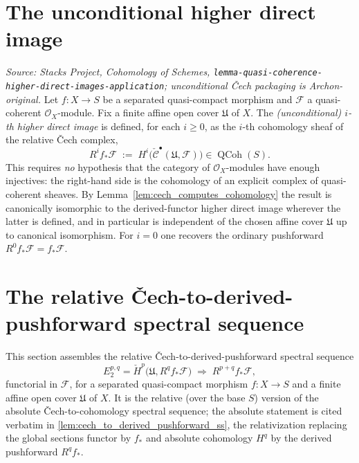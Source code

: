 \section{The unconditional higher direct image}

\begin{definition}\leanok
  \label{def:cech_higher_direct_image}
  \textit{Source: Stacks Project, Cohomology of Schemes,
  \texttt{lemma-quasi-coherence-higher-direct-images-application}; unconditional
  {\v C}ech packaging is Archon-original.}
  Let \(f : X \to S\) be a separated quasi-compact morphism and \(\mathcal{F}\) a
  quasi-coherent \(\mathcal{O}_X\)-module. Fix a finite affine open cover
  \(\mathfrak{U}\) of \(X\). The \emph{(unconditional) \(i\)-th higher direct
  image} is defined, for each \(i \geq 0\), as the \(i\)-th cohomology sheaf of the
  relative {\v C}ech complex,
  \[
    R^i f_*\mathcal{F} \;:=\;
      H^i\bigl(\check{\mathcal{C}}^\bullet(\mathfrak{U}, \mathcal{F})\bigr)
      \in \operatorname{QCoh}(S).
  \]
  This requires \emph{no} hypothesis that the category of \(\mathcal{O}_X\)-modules
  have enough injectives: the right-hand side is the cohomology of an explicit
  complex of quasi-coherent sheaves. By
  Lemma~\ref{lem:cech_computes_cohomology} the result is canonically isomorphic to
  the derived-functor higher direct image wherever the latter is defined, and in
  particular is independent of the chosen affine cover \(\mathfrak{U}\) up to
  canonical isomorphism. For \(i = 0\) one recovers the ordinary
  pushforward \(R^0 f_*\mathcal{F} = f_*\mathcal{F}\).
\end{definition}

\section{The relative {\v C}ech-to-derived-pushforward spectral sequence}
\label{sec:cech_to_derived_pushforward_ss}

This section assembles the relative {\v C}ech-to-derived-pushforward spectral
sequence
\[
  E_2^{p,q} = \check{H}^p\bigl(\mathfrak{U}, R^q f_* \mathcal{F}\bigr)
  \;\Longrightarrow\;
  R^{p+q} f_* \mathcal{F},
\]
functorial in \(\mathcal{F}\), for a separated quasi-compact morphism
\(f : X \to S\) and a finite affine open cover \(\mathfrak{U}\) of \(X\). It is the
relative (over the base \(S\)) version of the absolute {\v C}ech-to-cohomology
spectral sequence; the absolute statement is cited verbatim in
\cref{lem:cech_to_derived_pushforward_ss}, the relativization replacing the global
sections functor by \(f_*\) and absolute cohomology \(H^q\) by the derived
pushforward \(R^q f_*\).

